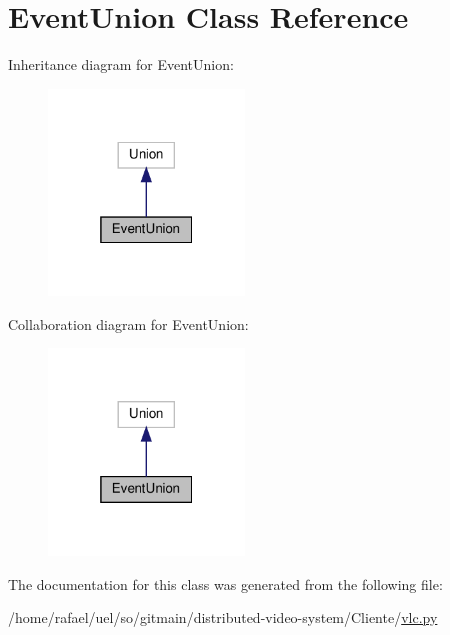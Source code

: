 \hypertarget{classvlc_1_1_event_union}{}\section{Event\+Union Class Reference}
\label{classvlc_1_1_event_union}


Inheritance diagram for Event\+Union\+:
\nopagebreak
\begin{figure}[H]
\begin{center}
\leavevmode
\includegraphics[width=148pt]{classvlc_1_1_event_union__inherit__graph}
\end{center}
\end{figure}


Collaboration diagram for Event\+Union\+:
\nopagebreak
\begin{figure}[H]
\begin{center}
\leavevmode
\includegraphics[width=148pt]{classvlc_1_1_event_union__coll__graph}
\end{center}
\end{figure}


The documentation for this class was generated from the following file\+:\begin{DoxyCompactItemize}
\item 
/home/rafael/uel/so/gitmain/distributed-\/video-\/system/\+Cliente/\hyperlink{vlc_8py}{vlc.\+py}\end{DoxyCompactItemize}
